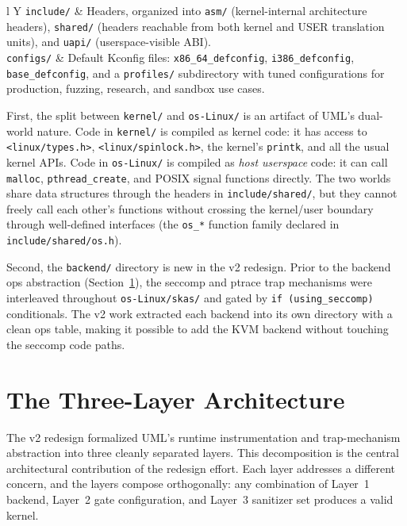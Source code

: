\begin{table}[ht]
\begin{tabularx}{\textwidth}{l Y}
\texttt{include/}  & Headers, organized into \texttt{asm/} (kernel-internal
                      architecture headers), \texttt{shared/} (headers
                      reachable from both kernel and USER translation units),
                      and \texttt{uapi/} (userspace-visible ABI). \\
\texttt{configs/}  & Default Kconfig files: \texttt{x86\_64\_defconfig},
                      \texttt{i386\_defconfig}, \texttt{base\_defconfig}, and a
                      \texttt{profiles/} subdirectory with tuned configurations
                      for production, fuzzing, research, and sandbox use
                      cases. \\
\bottomrule
\end{tabularx}
\end{table}

First, the split between \texttt{kernel/} and \texttt{os-Linux/} is an artifact
of UML's dual-world nature.  Code in \texttt{kernel/} is compiled as kernel
code: it has access to \texttt{<linux/types.h>}, \texttt{<linux/spinlock.h>},
the kernel's \texttt{printk}, and all the usual kernel APIs.  Code in
\texttt{os-Linux/} is compiled as \emph{host userspace} code: it can call
\texttt{malloc}, \texttt{pthread\_create}, and POSIX signal functions directly.
The two worlds share data structures through the headers in
\texttt{include/shared/}, but they cannot freely call each other's functions
without crossing the kernel/user boundary through well-defined interfaces (the
\texttt{os\_*} function family declared in \texttt{include/shared/os.h}).

Second, the \texttt{backend/} directory is new in the v2 redesign.  Prior to
the backend ops abstraction (Section~\ref{sec:three-layer}), the seccomp and
ptrace trap mechanisms were interleaved throughout \texttt{os-Linux/skas/} and
gated by \texttt{if (using\_seccomp)} conditionals.  The v2 work extracted each
backend into its own directory with a clean ops table, making it possible to
add the KVM backend without touching the seccomp code paths.


\section{The Three-Layer Architecture}
\label{sec:three-layer}

The v2 redesign formalized UML's runtime instrumentation and trap-mechanism
abstraction into three cleanly separated layers.  This decomposition is the
central architectural contribution of the redesign effort.  Each layer addresses
a different concern, and the layers compose orthogonally: any combination of
Layer~1 backend, Layer~2 gate configuration, and Layer~3 sanitizer set produces
a valid kernel.

